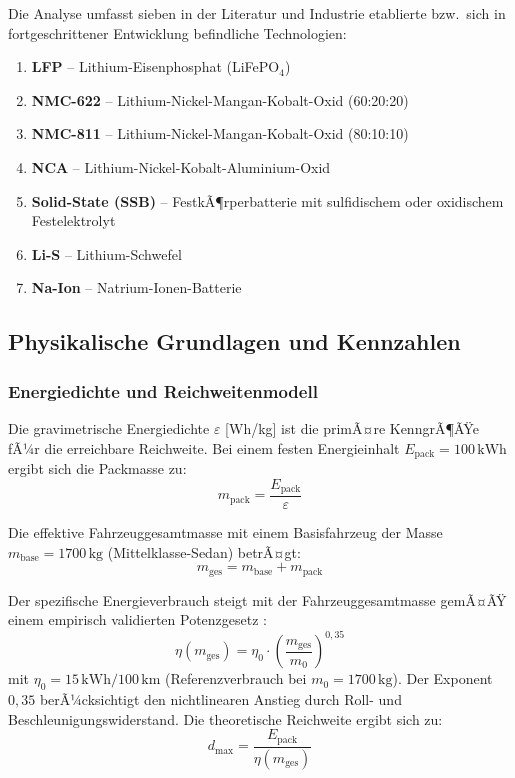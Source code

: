 ﻿\documentclass[12pt,a4paper]{article}
\begin{document}
	Die Analyse umfasst sieben in der Literatur und Industrie etablierte
	bzw.\ sich in fortgeschrittener Entwicklung befindliche Technologien:

	\begin{enumerate}
		\item \textbf{LFP} -- Lithium-Eisenphosphat (LiFePO$_4$)
		\item \textbf{NMC-622} -- Lithium-Nickel-Mangan-Kobalt-Oxid (60:20:20)
		\item \textbf{NMC-811} -- Lithium-Nickel-Mangan-Kobalt-Oxid (80:10:10)
		\item \textbf{NCA} -- Lithium-Nickel-Kobalt-Aluminium-Oxid
		\item \textbf{Solid-State (SSB)} -- FestkÃ¶rperbatterie mit sulfidischem
		      oder oxidischem Festelektrolyt
		\item \textbf{Li-S} -- Lithium-Schwefel
		\item \textbf{Na-Ion} -- Natrium-Ionen-Batterie
	\end{enumerate}

	\subsection{Physikalische Grundlagen und Kennzahlen}

	\subsubsection{Energiedichte und Reichweitenmodell}

	Die gravimetrische Energiedichte $\varepsilon$ [Wh/kg] ist die
	primÃ¤re KenngrÃ¶ÃŸe fÃ¼r die erreichbare Reichweite. Bei einem festen
	Energieinhalt $E_{\mathrm{pack}} = 100\,\mathrm{kWh}$ ergibt sich
	die Packmasse zu:
	\begin{equation}
		m_{\mathrm{pack}} = \frac{E_{\mathrm{pack}}}{\varepsilon}
		\label{eq:pack_mass}
	\end{equation}

	Die effektive Fahrzeuggesamtmasse mit einem Basisfahrzeug der Masse
	$m_{\mathrm{base}} = 1700\,\mathrm{kg}$ (Mittelklasse-Sedan) betrÃ¤gt:
	\begin{equation}
		m_{\mathrm{ges}} = m_{\mathrm{base}} + m_{\mathrm{pack}}
		\label{eq:total_mass}
	\end{equation}

	Der spezifische Energieverbrauch steigt mit der Fahrzeuggesamtmasse
	gemÃ¤ÃŸ einem empirisch validierten Potenzgesetz \cite{EV_Tesla2023}:
	\begin{equation}
		\eta(m_{\mathrm{ges}}) = \eta_0 \cdot
		\left(\frac{m_{\mathrm{ges}}}{m_0}\right)^{0{,}35}
		\label{eq:efficiency_mass}
	\end{equation}
	mit $\eta_0 = 15\,\mathrm{kWh}/100\,\mathrm{km}$ (Referenzverbrauch bei
	$m_0 = 1700\,\mathrm{kg}$). Der Exponent $0{,}35$ berÃ¼cksichtigt den
	nichtlinearen Anstieg durch Roll- und Beschleunigungswiderstand.
	Die theoretische Reichweite ergibt sich zu:
	\begin{equation}
		\boxed{d_{\mathrm{max}} = \frac{E_{\mathrm{pack}}}{\eta(m_{\mathrm{ges}})}}
		\label{eq:range}
	\end{equation}
\end{document}
